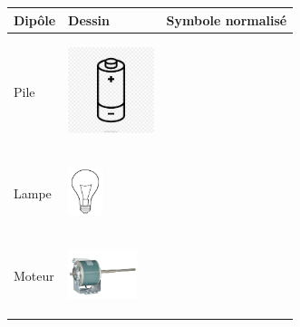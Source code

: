 \documentclass[11pt]{article}
\begin{document}
		\begin{center}
		\begin{tabular}{ |p{6cm}|p{6cm}|p{6cm}|  }
			\hline
			Dipôle 						& Dessin & Symbole normalisé \\\hline\hline
			Pile 						& 
			\begin{minipage}{.3\textwidth}
				\begin{center}
					\includegraphics[width=2.5cm]{pile.jpg}
				\end{center}
			  \end{minipage} &  \\\hline

			Lampe 	&
			\begin{minipage}{.3\textwidth}
				\begin{center}
					\includegraphics[width=1cm]{lampe.jpg}
				\end{center}
			  \end{minipage} &  \\\hline

			Moteur	& 
			\begin{minipage}{.3\textwidth}
				\begin{center}
					\includegraphics[width=2cm]{moteur.jpg}
				\end{center}
			  \end{minipage}  &  \\\hline


\end{tabular}
\end{center}
\end{document}
